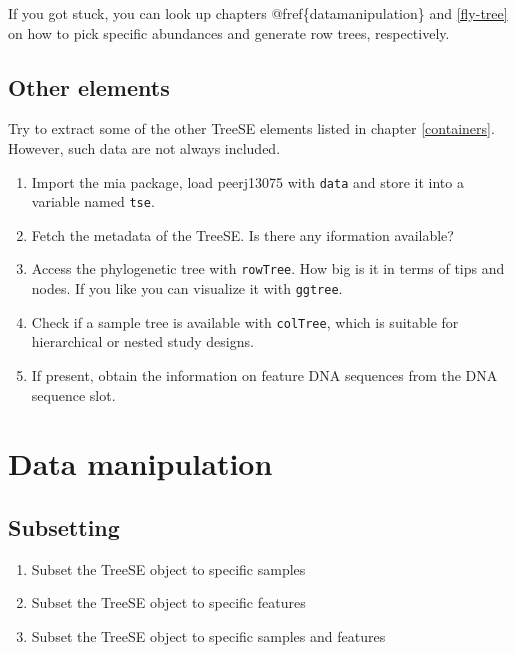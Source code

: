 \documentclass[
]{book}
\providecommand{\tightlist}{%
  \setlength{\itemsep}{0pt}\setlength{\parskip}{0pt}}
\begin{document}
If you got stuck, you can look up chapters @fref\{datamanipulation\}
and \ref{fly-tree} on how to pick specific abundances and generate
row trees, respectively.

\hypertarget{other-elements}{%
\subsection{Other elements}\label{other-elements}}

Try to extract some of the other TreeSE elements listed in chapter \ref{containers}.
However, such data are not always included.

\begin{enumerate}
\def\labelenumi{\arabic{enumi}.}
\tightlist
\item
  Import the mia package, load peerj13075 with \texttt{data} and store it into a
  variable named \texttt{tse}.
\item
  Fetch the metadata of the TreeSE. Is there any iformation available?
\item
  Access the phylogenetic tree with \texttt{rowTree}. How big is it in terms of tips
  and nodes. If you like you can visualize it with \texttt{ggtree}.
\item
  Check if a sample tree is available with \texttt{colTree}, which is suitable for
  hierarchical or nested study designs.
\item
  If present, obtain the information on feature DNA sequences from the DNA
  sequence slot.
\end{enumerate}

\hypertarget{data-manipulation}{%
\section{Data manipulation}\label{data-manipulation}}

\hypertarget{subsetting-1}{%
\subsection{Subsetting}\label{subsetting-1}}

\begin{enumerate}
\def\labelenumi{\arabic{enumi}.}
\tightlist
\item
  Subset the TreeSE object to specific samples
\item
  Subset the TreeSE object to specific features
\item
  Subset the TreeSE object to specific samples and features
\end{enumerate}
\end{document}
